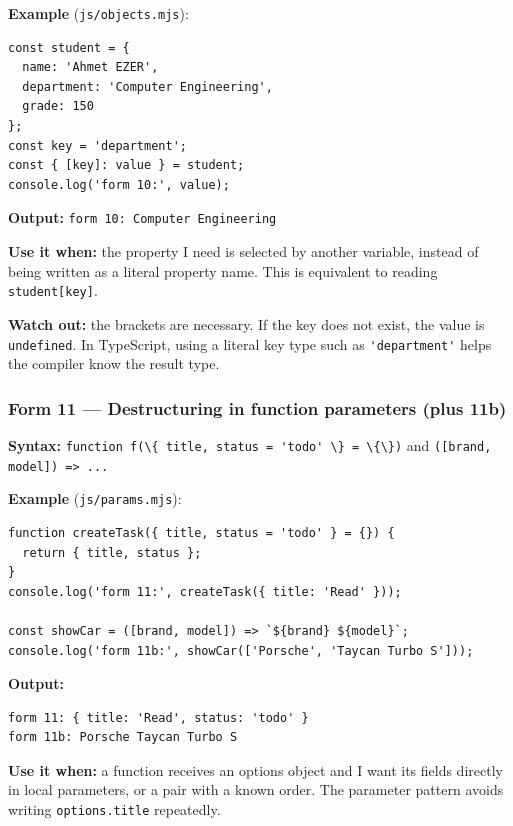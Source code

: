 \documentclass[
  9pt,
]{article}
\newcommand{\passthrough}[1]{#1}
\begin{document}
\textbf{Example} (\passthrough{\lstinline!js/objects.mjs!}):

\begin{lstlisting}
const student = {
  name: 'Ahmet EZER',
  department: 'Computer Engineering',
  grade: 150
};
const key = 'department';
const { [key]: value } = student;
console.log('form 10:', value);
\end{lstlisting}

\textbf{Output:} \passthrough{\lstinline!form 10: Computer Engineering!}

\textbf{Use it when:} the property I need is selected by another
variable, instead of being written as a literal property name. This is
equivalent to reading \passthrough{\lstinline!student[key]!}.

\textbf{Watch out:} the brackets are necessary. If the key does not
exist, the value is \passthrough{\lstinline!undefined!}. In TypeScript,
using a literal key type such as \passthrough{\lstinline!'department'!}
helps the compiler know the result type.

\subsubsection{Form 11 --- Destructuring in function parameters (plus
11b)}\label{form-11-destructuring-in-function-parameters-plus-11b}

\textbf{Syntax:}
\passthrough{\lstinline!function f(\{ title, status = 'todo' \} = \{\})!}
and \passthrough{\lstinline!([brand, model]) => ...!}

\textbf{Example} (\passthrough{\lstinline!js/params.mjs!}):

\begin{lstlisting}
function createTask({ title, status = 'todo' } = {}) {
  return { title, status };
}
console.log('form 11:', createTask({ title: 'Read' }));

const showCar = ([brand, model]) => `${brand} ${model}`;
console.log('form 11b:', showCar(['Porsche', 'Taycan Turbo S']));
\end{lstlisting}

\textbf{Output:}

\begin{lstlisting}
form 11: { title: 'Read', status: 'todo' }
form 11b: Porsche Taycan Turbo S
\end{lstlisting}

\textbf{Use it when:} a function receives an options object and I want
its fields directly in local parameters, or a pair with a known order.
The parameter pattern avoids writing
\passthrough{\lstinline!options.title!} repeatedly.
\end{document}
